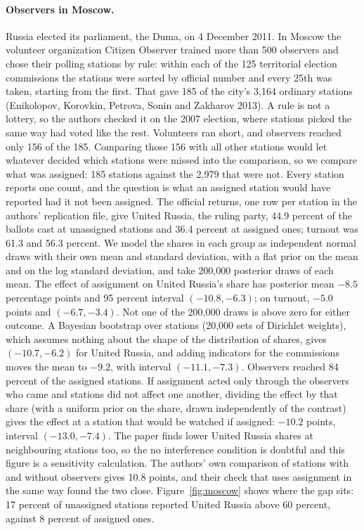 \paragraph{Observers in Moscow.} Russia elected its parliament, the Duma, on 4 December 2011. In Moscow the volunteer organization Citizen Observer trained more than 500 observers and chose their polling stations by rule: within each of the 125 territorial election commissions the stations were sorted by official number and every 25th was taken, starting from the first. That gave 185 of the city's 3,164 ordinary stations (Enikolopov, Korovkin, Petrova, Sonin and Zakharov 2013). A rule is not a lottery, so the authors checked it on the 2007 election, where stations picked the same way had voted like the rest. Volunteers ran short, and observers reached only 156 of the 185. Comparing those 156 with all other stations would let whatever decided which stations were missed into the comparison, so we compare what was assigned: 185 stations against the 2,979 that were not. Every station reports one count, and the question is what an assigned station would have reported had it not been assigned. The official returns, one row per station in the authors' replication file, give United Russia, the ruling party, 44.9 percent of the ballots cast at unassigned stations and 36.4 percent at assigned ones; turnout was 61.3 and 56.3 percent. We model the shares in each group as independent normal draws with their own mean and standard deviation, with a flat prior on the mean and on the log standard deviation, and take 200,000 posterior draws of each mean. The effect of assignment on United Russia's share has posterior mean $-8.5$ percentage points and 95 percent interval $(-10.8, -6.3)$; on turnout, $-5.0$ points and $(-6.7, -3.4)$. Not one of the 200,000 draws is above zero for either outcome. A Bayesian bootstrap over stations (20,000 sets of Dirichlet weights), which assumes nothing about the shape of the distribution of shares, gives $(-10.7, -6.2)$ for United Russia, and adding indicators for the commissions moves the mean to $-9.2$, with interval $(-11.1, -7.3)$. Observers reached 84 percent of the assigned stations. If assignment acted only through the observers who came and stations did not affect one another, dividing the effect by that share (with a uniform prior on the share, drawn independently of the contrast) gives the effect at a station that would be watched if assigned: $-10.2$ points, interval $(-13.0, -7.4)$. The paper finds lower United Russia shares at neighbouring stations too, so the no interference condition is doubtful and this figure is a sensitivity calculation. The authors' own comparison of stations with and without observers gives 10.8 points, and their check that uses assignment in the same way found the two close. Figure~\ref{fig:moscow} shows where the gap sits: 17 percent of unassigned stations reported United Russia above 60 percent, against 8 percent of assigned ones.

